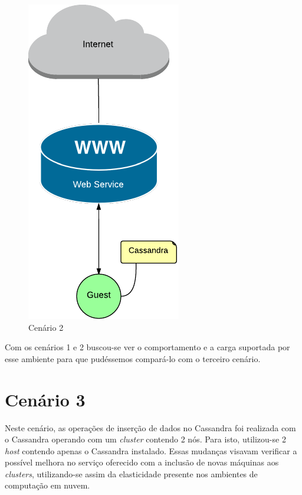     \begin{figure}[H]
    \centering
    \includegraphics[scale=0.60]{imagens/BD-1Guest.pdf}
    \caption{Cenário 2}
    \label{fig:bd1guest}
    \end{figure} 

Com os cenários 1 e 2 buscou-se ver o comportamento e a carga suportada por esse ambiente para que pudéssemos compará-lo com o terceiro cenário.

\section{Cenário 3}
Neste cenário, as operações de inserção de dados no Cassandra foi realizada com o Cassandra operando com um \textit{cluster} contendo 2 nós.
Para isto, utilizou-se 2 \textit{host} contendo apenas o Cassandra instalado.
Essas mudanças visavam verificar a possível melhora no serviço oferecido com a inclusão de novas máquinas aos \textit{clusters}, utilizando-se assim da elasticidade presente nos ambientes de computação em nuvem.

